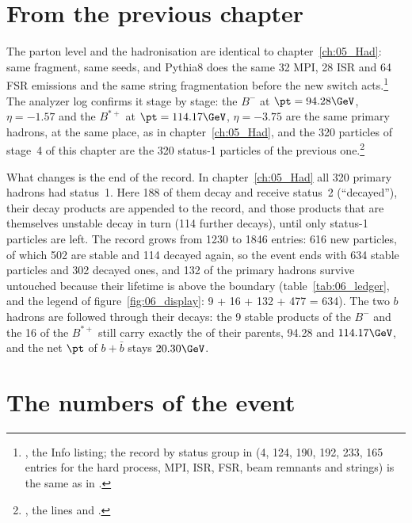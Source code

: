 \section{From the previous chapter}
The parton level and the hadronisation are identical to chapter~\ref{ch:05_Had}: same fragment, same seeds,
and Pythia8 does the same 32 MPI, 28 ISR and 64 FSR emissions and the same string fragmentation
before the new switch acts.\footnote{, the Info listing; the
record by status group in  (4, 124, 190, 192, 233, 165 entries for the hard process,
MPI, ISR, FSR, beam remnants and strings) is the same as in .} The
analyzer log confirms it stage by stage: the $B^-$ at $\pt = 94.28\GeV$, $\eta = -1.57$ and the $B^{*+}$ at
$\pt = 114.17\GeV$, $\eta = -3.75$ are the same primary hadrons, at the same place, as in
chapter~\ref{ch:05_Had}, and the 320 particles of stage~4 of this chapter are the 320 status-1 particles of the
previous one.\footnote{, the lines  and
.}

What changes is the end of the record. In chapter~\ref{ch:05_Had} all 320 primary hadrons had status~1. Here
188 of them decay and receive status~2 (``decayed''), their decay products are appended to the record, and
those products that are themselves unstable decay in turn (114 further decays), until only status-1 particles
are left. The record grows from 1230 to 1846 entries: 616 new particles, of which 502 are stable and 114 decayed
again, so the event ends with 634 stable particles and 302 decayed ones, and 132 of the primary hadrons survive
untouched because their lifetime is above the boundary (table~\ref{tab:06_ledger}, and the legend of
figure~\ref{fig:06_display}: 9 + 16 + 132 + 477 = 634). The two $b$ hadrons are followed through their decays:
the 9 stable products of the $B^-$ and the 16 of the $B^{*+}$ still carry exactly the \pt{} of their parents,
94.28 and $114.17\GeV$, and the net $\pt$ of $b + \bar{b}$ stays $20.30\GeV$.

\section{The numbers of the event}
